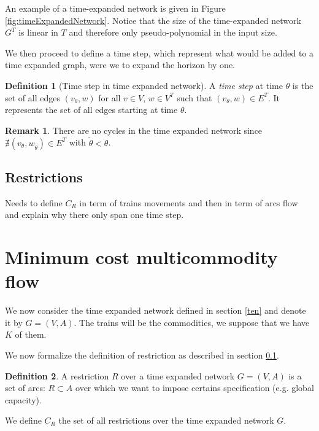 \documentclass[14pt,a4paper]{article}
\theoremstyle{definition}
\newtheorem{madef}{Definition}[section]
\newtheorem*{remark}{Remark}
\numberwithin{equation}{subsection}
\begin{document}
An example of a time-expanded network is given in Figure \ref{fig:timeExpandedNetwork}. Notice that the size of the	time-expanded network $G^T$ is linear in $T$ and therefore only pseudo-polynomial in the input
size.


We then proceed to define a time step, which represent what would be added to a time expanded graph, were we to expand the horizon by one.

\begin{madef}[Time step in time expanded network]	
	A \emph{time step} at time $\theta$ is the set of all edges $(v_\theta,w)$ for all $v \in V$, $w \in V^T$ such that $(v_\theta,w) \in E^T$. 
	It represents the set of all edges starting at time $\theta$.
\end{madef}



\begin{remark}
	There are no cycles in the time expanded network since $\nexists (v_\theta,w_{\tilde{\theta}}) \in E^T$ with $\tilde{\theta} < \theta$.
\end{remark}
	
\subsection{Restrictions}
\label{sec:restrictions}
Needs to define $C_R$ in term of trains movements and then in term of arcs flow and explain why there only span one time step.



\newpage
\section{Minimum cost multicommodity flow}

We now consider the time expanded network defined in section \ref*{ten} and denote it by $G = (V,A)$. The trains will be the commodities, we suppose that we have $K$ of them.

We now formalize the definition of restriction as described in section \ref*{sec:restrictions}.

\begin{madef}
	A restriction $R$ over a time expanded network $G = (V,A)$ is a set of arcs: $R \subset A$ over which we want to impose certains specification (e.g. global capacity).
	
	We define $C_R$ the set of all restrictions over the time expanded network $G$.
\end{madef}
\end{document}
